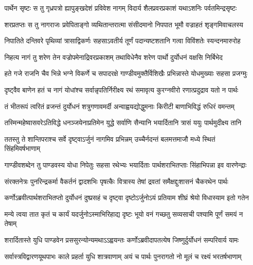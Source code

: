 \twolineshloka
{पार्थेन सृष्टः स तु गृध्रपत्रो ह्यापुङ्खदेशं प्रविवेश नागम्}
{विदार्य शैलप्रवरप्रकाशं यथाऽशनिः पर्वतमिन्द्रसृष्टः}


\twolineshloka
{शरप्रतप्तः स तु नागराजः प्रवेपिताङ्गो व्यथितान्तरात्मा}
{संसीदमानो निपपात भूमौ वज्राहतं शृङ्गमिवाचलस्य}


\twolineshloka
{निपातिते दन्तिवरे पृथिव्यां त्रासाद्विकर्णः सहसाऽवतीर्य}
{तूर्णं पदान्यष्टशतानि गत्वा विविंशतेः स्यन्दनमारुरोह}


\twolineshloka
{निहत्य नागं तु शरेण तेन वज्रोपमेनाद्रिवरप्रकाशम्}
{तथाविधेनैव शरेण पार्थो दुर्योधनं वक्षसि निर्बिभेद}


\twolineshloka
{हते गजे राजनि चैव भिन्ने भग्ने विकर्णे च सपादरक्षे}
{गाण्डीवमुक्तैर्विशिखैः प्रभिन्नास्ते योधमुख्याः सहसा प्रजग्मुः}


\twolineshloka
{दृष्ट्वैव बाणेन हतं च नागं योधांश्च सर्वान्नृपतिर्निरीक्ष्य}
{रथं समावृत्य कुरग्नवीरो रणात्प्रदुद्राव यतो न पार्थः}


\twolineshloka
{तं भीतरूपं त्वरितं व्रजन्तं दुर्योधनं शत्रुगणावमर्दी}
{अन्वाह्वयद्योद्धुमनाः किरीटी बाणाभिविद्धं रुधिरं वमन्तम्}


\twolineshloka
{तस्मिन्महेष्वासवरेऽतिविद्धे धनञ्जयेनाप्रतिमेन युद्धे}
{सर्वाणि सैन्यानि भयार्दितानि त्रासं ययुः पार्थमुदीक्ष्य तानि}


\twolineshloka
{ततस्तु ते शान्तिपराश्च सर्वे दृष्ट्वाऽर्जुनं नागमिव प्रभिन्नम्}
{उच्चैर्नदन्तं बलमत्तमाजौ मध्ये स्थितं सिंहमिवर्षभाणाम्}


\twolineshloka
{गाण्डीवशब्देन तु पाण्डवस्य योधा निपेतुः सहसा रथेभ्यः}
{भयार्दिताः पार्थशराभितप्ताः सिंहाभिपन्ना इव वारणेन्द्राः}


\twolineshloka
{संरक्तनेत्रः पुनरिन्द्रकर्मा वैकर्तनं द्वादशभिः पृषत्कैः}
{वित्रास्य तेषां द्रवतां समैक्षद्दुःशासनं चैकरथेन पार्थः}


\twolineshloka
{कर्णोऽब्रवीत्पार्थशराभितप्तो दुर्योधनं दुष्प्रसहं च दृष्ट्वा}
{दृष्टोऽर्जुनोऽयं प्रतियाम शीघ्रं श्रेयो विधास्याम इतो गतेन}


\twolineshloka
{मन्ये त्वया तात कृतं च कार्यं यदर्जुनोऽस्माभिरिहाद्य दृष्टः}
{भूयो वनं गच्छतु सव्यसाची पश्यामि पूर्णं समयं न तेषाम्}



\twolineshloka
{शरार्दितास्ते युधि पाण्डवेन प्रससुरन्योन्यमथाऽऽह्वयन्तः}
{कर्णोऽब्रवीदापतत्येष जिष्णुर्दुर्योधनं सम्परिवार्य यामः}


\twolineshloka
{सर्वास्त्रविद्वारणयूथपाभः काले प्रहर्ता युधि शात्रवाणाम्}
{अयं च पार्थः पुनरागतो नो मूलं च रक्ष्यं भरतर्षभाणाम्}


